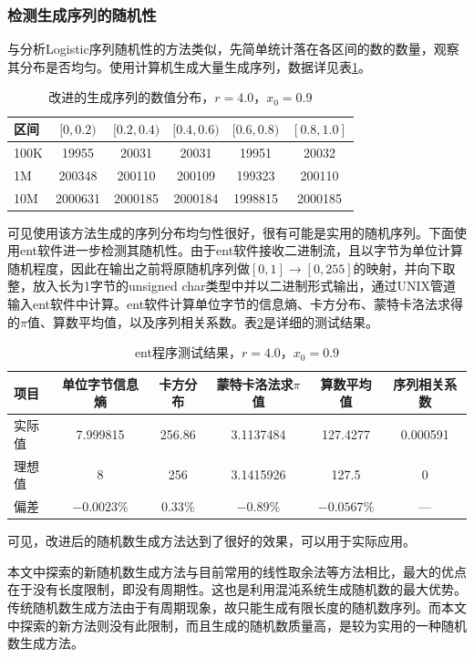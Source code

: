 \documentclass[UTF8]{ctexart}
\begin{document}
\subsubsection{检测生成序列的随机性}
与分析Logistic序列随机性的方法类似，先简单统计落在各区间的数的数量，观察其分布是否均匀。使用计算机生成大量生成序列，数据详见表\ref{improveddistribution}。

\begin{table}[h]
\centering
\caption{改进的生成序列的数值分布，$r=4.0$，$x_0=0.9$}
\label{improveddistribution}
\begin{tabular}{ l || c c c c c}
区间       & $[0, 0.2)$ & $[0.2, 0.4)$   & $[0.4, 0.6)$  & $[0.6, 0.8)$ & $[0.8, 1.0]$ \\ \hline
100K & 19955 & 20031 & 20031 & 19951 & 20032  \\
1M   & 200348 & 200110 & 200109 & 199323 & 200110 \\
10M & 2000631 & 2000185 & 2000184 & 1998815 & 2000185
\end{tabular}
\end{table}
可见使用该方法生成的序列分布均匀性很好，很有可能是实用的随机序列。下面使用ent软件进一步检测其随机性。由于ent软件接收二进制流，且以字节为单位计算随机程度，因此在输出之前将原随机序列做$[0, 1] \to [0, 255]$的映射，并向下取整，放入长为1字节的unsigned char类型中并以二进制形式输出，通过UNIX管道输入ent软件中计算。ent软件计算单位字节的信息熵、卡方分布、蒙特卡洛法求得的$\pi$值、算数平均值，以及序列相关系数。表\ref{results}是详细的测试结果。
\begin{table}[h]
\centering
\caption{ent程序测试结果，$r=4.0$，$x_0=0.9$}
\label{results}
\begin{tabular}{ l || c c c c c}
项目       & 单位字节信息熵 & 卡方分布   & 蒙特卡洛法求$\pi$值  & 算数平均值 & 序列相关系数\\ \hline
实际值 & 7.999815 & 256.86 & 3.1137484 & 127.4277 & 0.000591  \\
理想值 & 8 & 256 & 3.1415926 & 127.5 & 0 \\
偏差 & $-0.0023\%$ & $0.33\%$ & $-0.89\%$ & $-0.0567\%$ & ---
\end{tabular}
\end{table}
可见，改进后的随机数生成方法达到了很好的效果，可以用于实际应用。

本文中探索的新随机数生成方法与目前常用的线性取余法等方法相比，最大的优点在于没有长度限制，即没有周期性。这也是利用混沌系统生成随机数的最大优势。传统随机数生成方法由于有周期现象，故只能生成有限长度的随机数序列。而本文中探索的新方法则没有此限制，而且生成的随机数质量高，是较为实用的一种随机数生成方法。
\end{document}

